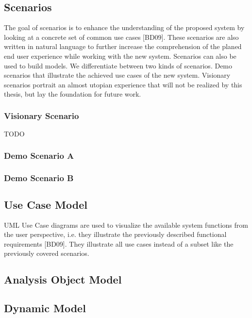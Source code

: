 \subsection{Scenarios}

The goal of scenarios is to enhance the understanding of the proposed system by looking at a concrete set of common use cases [BD09].
These scenarios are also written in natural language to further increase the comprehension of the planed end user experience while working with the new system.
Scenarios can also be used to build models. We differentiate between two kinds of scenarios.
Demo scenarios that illustrate the achieved use cases of the new system.
Visionary scenarios portrait an almost utopian experience that will not be realized by this thesis, but lay the foundation for future work.

\subsubsection{Visionary Scenario}
TODO
\subsubsection{Demo Scenario A}

\subsubsection{Demo Scenario B}

\subsection{Use Case Model}
UML Use Case diagrams are used to visualize the available system functions from the user perspective, i.e. they illustrate the previously described functional requirements [BD09].
They illustrate all use cases instead of a subset like the previously covered scenarios.

\subsection{Analysis Object Model}
\subsection{Dynamic Model}
